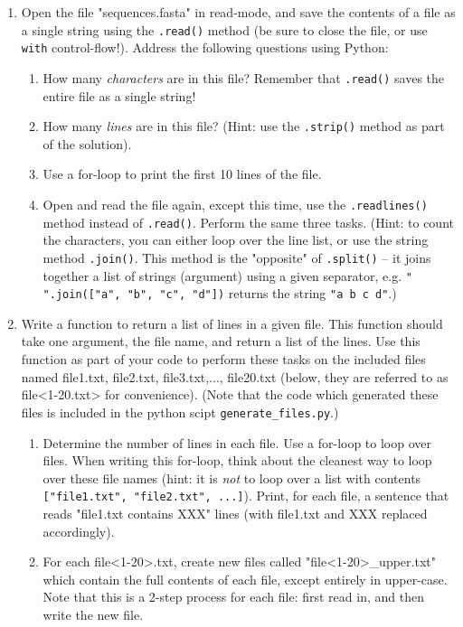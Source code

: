 \documentclass{article}[12pt]
\newcommand{\code}[1]{\texttt{#1}}  %
\begin{document}
\begin{enumerate}[itemsep=5ex]

	\item Open the file "sequences.fasta" in read-mode, and save the contents of a file as a single string using the \code{.read()} method (be sure to close the file, or use \code{with} control-flow!). Address the following questions using Python:
	
	\begin{enumerate}[itemsep=2ex]
		\item How many \emph{characters} are in this file? Remember that \code{.read()} saves the entire file as a single string!
		\item How many \emph{lines} are in this file? (Hint: use the \code{.strip()} method as part of the solution).
		\item Use a for-loop to print the first 10 lines of the file.
		\item Open and read the file again, except this time, use the \code{.readlines()} method instead of \code{.read()}. Perform the same three tasks. (Hint: to count the characters, you can either loop over the line list, or use the string method \code{.join()}. This method is the "opposite" of \code{.split()} -- it joins together a list of strings (argument) using a given separator, e.g. \code{" ".join(["a", "b", "c", "d"])} returns the string \code{"a b c d"}.)
	\end{enumerate}
	
	\item Write a function to return a list of lines in a given file. This function should take one argument, the file name, and return a list of the lines. Use this function as part of your code to perform these tasks on the included files named file1.txt, file2.txt, file3.txt,..., file20.txt (below, they are referred to as file<1-20.txt> for convenience). (Note that the code which generated these files is included in the python scipt \code{generate\_files.py}.)
		\begin{enumerate}[itemsep=2ex]
			\item Determine the number of lines in each file. Use a for-loop to loop over files. When writing this for-loop, think about the cleanest way to loop over these file names (hint: it is \emph{not} to loop over a list with contents \code{["file1.txt", "file2.txt", ...]}). Print, for each file, a sentence that reads "file1.txt contains XXX" lines (with file1.txt and XXX replaced accordingly).
			\item For each file<1-20>.txt, create new files called "file<1-20>\_upper.txt" which contain the full contents of each file, except entirely in upper-case. Note that this is a 2-step process for each file: first read in, and then write the new file. 
		\end{enumerate}
	

\end{enumerate}
\end{document}
